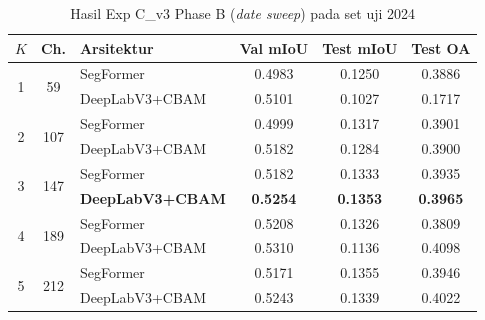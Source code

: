 \begin{table}[H]
    \centering
    \caption{Hasil Exp C\_v3 Phase B (\textit{date sweep}) pada set uji 2024}
    \label{tab:cv3_date_results}
    \begin{tabular}{|c|c|l|c|c|c|}
    \hline
    $K$ & \textbf{Ch.} & \textbf{Arsitektur} & \textbf{Val mIoU} & \textbf{Test mIoU} & \textbf{Test OA} \\
    \hline
    \multirow{2}{*}{1} & \multirow{2}{*}{59}  & SegFormer      & 0.4983 & 0.1250 & 0.3886 \\
                       &                      & DeepLabV3+CBAM & 0.5101 & 0.1027 & 0.1717 \\
    \hline
    \multirow{2}{*}{2} & \multirow{2}{*}{107} & SegFormer      & 0.4999 & 0.1317 & 0.3901 \\
                       &                      & DeepLabV3+CBAM & 0.5182 & 0.1284 & 0.3900 \\
    \hline
    \multirow{2}{*}{3} & \multirow{2}{*}{147} & SegFormer          & 0.5182 & 0.1333 & 0.3935 \\
                       &                      & \textbf{DeepLabV3+CBAM} & \textbf{0.5254} & \textbf{0.1353} & \textbf{0.3965} \\
    \hline
    \multirow{2}{*}{4} & \multirow{2}{*}{189} & SegFormer      & 0.5208 & 0.1326 & 0.3809 \\
                       &                      & DeepLabV3+CBAM & 0.5310 & 0.1136 & 0.4098 \\
    \hline
    \multirow{2}{*}{5} & \multirow{2}{*}{212} & SegFormer      & 0.5171 & 0.1355 & 0.3946 \\
                       &                      & DeepLabV3+CBAM & 0.5243 & 0.1339 & 0.4022 \\
    \hline
    \end{tabular}
\end{table}

